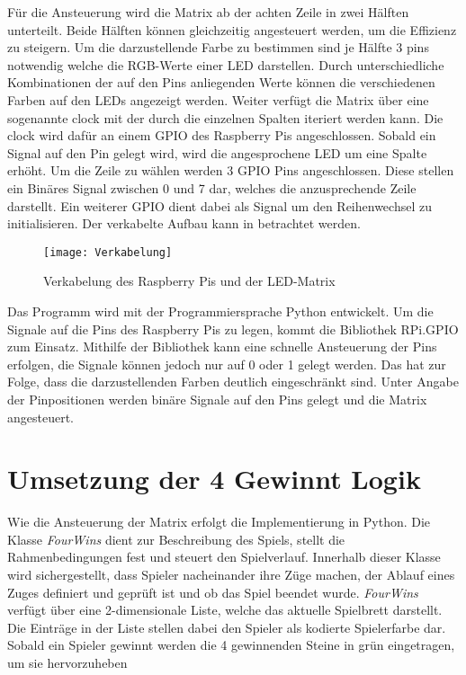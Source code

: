 Für die Ansteuerung wird die Matrix ab der achten Zeile in zwei Hälften unterteilt. Beide Hälften können gleichzeitig angesteuert werden, um die Effizienz zu steigern. Um die darzustellende Farbe zu bestimmen sind je Hälfte 3 pins notwendig welche die RGB-Werte einer LED darstellen. Durch unterschiedliche Kombinationen der auf den Pins anliegenden Werte können die verschiedenen Farben auf den LEDs angezeigt werden. Weiter verfügt die Matrix über eine sogenannte \glqq clock \grqq{} mit der durch die einzelnen Spalten iteriert werden kann. Die \glqq clock \grqq{} wird dafür an einem GPIO des Raspberry Pis angeschlossen. Sobald ein Signal auf den Pin gelegt wird, wird die angesprochene LED um eine Spalte erhöht. Um die Zeile zu wählen werden 3 GPIO Pins angeschlossen. Diese stellen ein Binäres Signal zwischen 0 und 7 dar, welches die anzusprechende Zeile darstellt. Ein weiterer GPIO dient dabei als Signal um den Reihenwechsel zu initialisieren. Der verkabelte Aufbau kann in  betrachtet werden.

\begin{figure}[!hbt]
	\centering
	\texttt{[image: Verkabelung]}
	\caption{Verkabelung des Raspberry Pis und der LED-Matrix}
	\label{verkabelung}
\end{figure}

Das Programm wird mit der Programmiersprache Python entwickelt. Um die Signale auf die Pins des Raspberry Pis zu legen, kommt die Bibliothek RPi.GPIO zum Einsatz. Mithilfe der Bibliothek kann eine schnelle Ansteuerung der Pins erfolgen, die Signale können jedoch nur auf 0 oder 1 gelegt werden. Das hat zur Folge, dass die darzustellenden Farben deutlich eingeschränkt sind. Unter Angabe der Pinpositionen werden binäre Signale auf den Pins gelegt und die Matrix angesteuert.

\section{Umsetzung der 4 Gewinnt Logik}
Wie die Ansteuerung der Matrix erfolgt die Implementierung in Python. Die Klasse \textit{FourWins} dient zur Beschreibung des Spiels, stellt die Rahmenbedingungen fest und steuert den Spielverlauf. Innerhalb dieser Klasse wird sichergestellt, dass Spieler nacheinander ihre Züge machen, der Ablauf eines Zuges definiert und geprüft ist und ob das Spiel beendet wurde. \textit{FourWins} verfügt über eine 2-dimensionale Liste, welche das aktuelle Spielbrett darstellt. Die Einträge in der Liste stellen dabei den Spieler als kodierte Spielerfarbe dar. Sobald ein Spieler gewinnt werden die 4 gewinnenden Steine in grün eingetragen, um sie hervorzuheben


